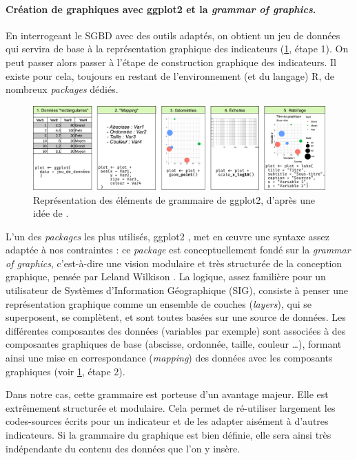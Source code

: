 \paragraph{Création de graphiques avec \textsf{ggplot2} et la \og \textit{grammar of graphics}\fg{}.}

En interrogeant le SGBD avec des outils adaptés, on obtient un jeu de données qui servira de base à la représentation graphique des indicateurs (\cref{fig:socviz-ggplot2}, étape 1).
On peut passer alors passer à l'étape de construction graphique des indicateurs.
Il existe pour cela, toujours en restant de l'environnement (et du langage) \textsf{R}, de nombreux \textit{packages} dédiés.

\begin{figure}[H]
	\centering
	\captionsetup{width=0.9\linewidth}
	\includegraphics[width=\linewidth]{img/grammar-graphics-steps.pdf}
	\caption{Représentation des éléments de grammaire de \textsf{ggplot2}, d'après une idée de \textcite{healy_data_2018}.
	}
	\label{fig:socviz-ggplot2}
\end{figure}

L'un des \textit{packages} les plus utilisés, \textsf{ggplot2} \autocite{wickham_ggplot2_2016}, met en œuvre une syntaxe assez adaptée à nos contraintes : ce \textit{package} est conceptuellement fondé sur la \og \textit{grammar of graphics}\fg{}, c'est-à-dire une vision modulaire et très structurée de la conception graphique, pensée par Leland Wilkison \autocite{wilkinson_grammar_2006}.
La logique, assez familière pour un utilisateur de Systèmes d'Information Géographique (SIG), consiste à penser une représentation graphique comme un ensemble de couches (\textit{layers}), qui se superposent, se complètent, et sont toutes basées sur une source de données.
Les différentes composantes des données (variables par exemple) sont associées à des composantes graphiques de base (abscisse, ordonnée, taille, couleur \ldots), formant ainsi une mise en correspondance (\textit{mapping}) des données avec les composants graphiques (voir \cref{fig:socviz-ggplot2}, étape 2).

Dans notre cas, cette grammaire est porteuse d'un avantage majeur.
Elle est extrêmement structurée et modulaire.
Cela permet de ré-utiliser largement les codes-sources écrits pour un indicateur et de les adapter aisément à d'autres indicateurs.
Si la grammaire du graphique est bien définie, elle sera ainsi très indépendante du contenu des données que l'on y insère.


